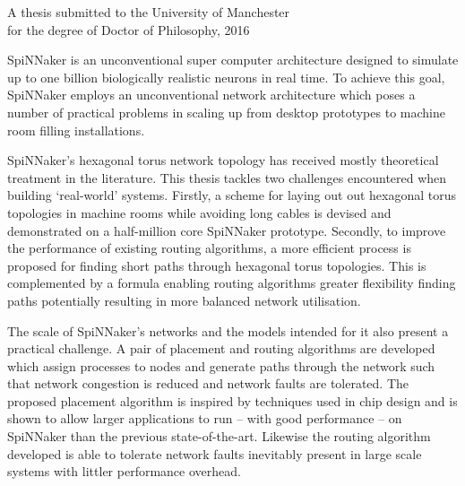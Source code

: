 {
	
	
	
	\vfill
	
	\begin{center}
		\textsc{\large\thesistitle}
		
		\vspace{0.5em}
		
		\thesisauthor
		
		\vspace{0.5em}
		
		A thesis submitted to the University of Manchester\\
		for the degree of Doctor of Philosophy, 2016
	\end{center}
	
	\vfill
	
	
	SpiNNaker is an unconventional super computer architecture designed to
	simulate up to one billion biologically realistic neurons in real time. To
	achieve this goal, SpiNNaker employs an unconventional network architecture
	which poses a number of practical problems in scaling up from desktop
	prototypes to machine room filling installations.
	
	SpiNNaker's hexagonal torus network topology has received mostly theoretical
	treatment in the literature. This thesis tackles two challenges encountered
	when building `real-world' systems.  Firstly, a scheme for laying out out
	hexagonal torus topologies in machine rooms while avoiding long cables is
	devised and demonstrated on a half-million core SpiNNaker prototype.
	Secondly, to improve the performance of existing routing algorithms, a more
	efficient process is proposed for finding short paths through hexagonal torus
	topologies. This is complemented by a formula enabling routing algorithms
	greater flexibility finding paths potentially resulting in more balanced
	network utilisation.
	
	The scale of SpiNNaker's networks and the models intended for it also present
	a practical challenge. A pair of placement and routing algorithms are
	developed which assign processes to nodes and generate paths through the
	network such that network congestion is reduced and network faults are
	tolerated.  The proposed placement algorithm is inspired by techniques used
	in chip design and is shown to allow larger applications to run -- with good
	performance -- on SpiNNaker than the previous state-of-the-art. Likewise the
	routing algorithm developed is able to tolerate network faults inevitably
	present in large scale systems with littler performance overhead.
	
	
	\par%
}
